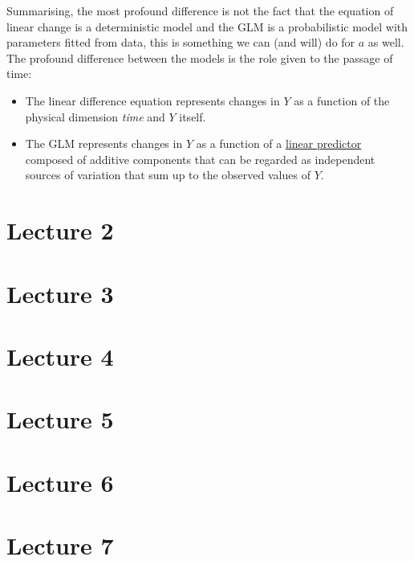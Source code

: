 \documentclass[]{book}
\providecommand{\tightlist}{%
  \setlength{\itemsep}{0pt}\setlength{\parskip}{0pt}}
\begin{document}
Summarising, the most profound difference is not the fact that the
equation of linear change is a deterministic model and the GLM is a
probabilistic model with parameters fitted from data, this is something
we can (and will) do for \(a\) as well. The profound difference between
the models is the role given to the passage of time:

\begin{itemize}
\tightlist
\item
  The linear difference equation represents changes in \(Y\) as a
  function of the physical dimension \emph{time} and \(Y\) itself.
\item
  The GLM represents changes in \(Y\) as a function of a
  \href{https://en.wikipedia.org/wiki/Linear_predictor_function}{linear
  predictor} composed of additive components that can be regarded as
  independent sources of variation that sum up to the observed values of
  \(Y\).
\end{itemize}

\chapter*{Lecture 2}\label{lecture-2}

\chapter*{Lecture 3}\label{lecture-3}

\chapter*{Lecture 4}\label{lecture-4}

\chapter*{Lecture 5}\label{lecture-5}

\chapter*{Lecture 6}\label{lecture-6}

\chapter*{Lecture 7}\label{lecture-7}
\end{document}
